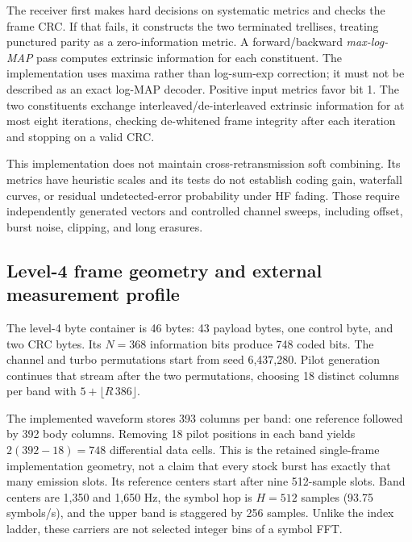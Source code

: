 The receiver first makes hard decisions on systematic metrics and checks the
frame CRC. If that fails, it constructs the two terminated trellises, treating
punctured parity as a zero-information metric. A forward/backward
\emph{max-log-MAP} pass computes extrinsic information for each constituent.
The implementation uses maxima rather than log-sum-exp correction; it must
not be described as an exact log-MAP decoder. Positive input metrics favor
bit 1. The two constituents exchange interleaved/de-interleaved extrinsic
information for at most eight iterations, checking de-whitened frame integrity
after each iteration and stopping on a valid CRC.


This implementation does not maintain cross-retransmission soft combining.
Its metrics have heuristic scales and its tests do not establish coding gain,
waterfall curves, or residual undetected-error probability under HF fading.
Those require independently generated vectors and controlled channel sweeps,
including offset, burst noise, clipping, and long erasures.

\subsection{Level-4 frame geometry and external measurement profile}
The level-4 byte container is 46 bytes: 43 payload bytes, one control byte,
and two CRC bytes. Its $N=368$ information bits produce 748 coded bits. The
channel and turbo permutations start from seed 6,437,280. Pilot generation
continues that stream after the two permutations, choosing 18 distinct columns
per band with $5+\lfloor R\,386\rfloor$.

The implemented waveform stores 393 columns per band: one reference followed
by 392 body columns. Removing 18 pilot positions in each band yields
$2(392-18)=748$ differential data cells. This is the retained single-frame
implementation geometry, not a claim that every stock burst has exactly that
many emission slots. Its reference centers start after nine 512-sample slots.
Band centers are 1,350 and 1,650 Hz, the symbol hop is $H=512$ samples
(93.75 symbols/s), and the upper band is staggered by 256 samples. Unlike the
index ladder, these carriers are not selected integer bins of a symbol FFT.

